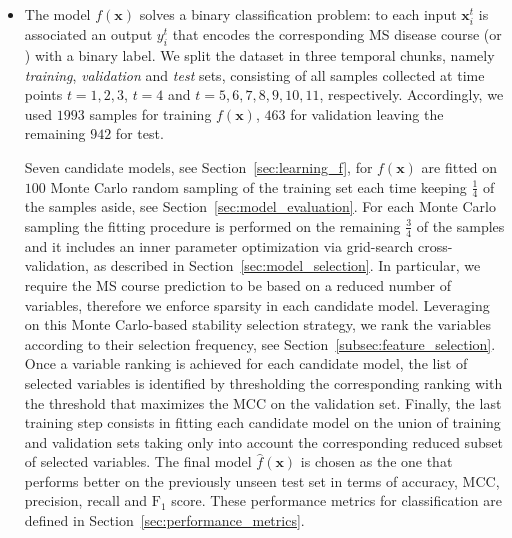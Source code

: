 \begin{itemize}
	\item[] \textbf{\F} The \F model $f(\bm{x})$ solves a binary classification problem: to each input $\bm{x}_i^t$ is associated  an output $y_i^t$ that encodes the corresponding MS disease course (\RR or \SP) with a binary label.
	We split the dataset in three temporal chunks, namely \textit{training}, \textit{validation} and \textit{test} sets, consisting of all samples collected at time points $t=1,2,3$, $t=4$ and $t=5,6,7,8,9,10,11$, respectively.
	Accordingly, we used $1993$ samples for training $f(\bm{x})$, $463$ for validation leaving the remaining $942$ for test.
	
	Seven candidate models, see Section~\ref{sec:learning_f}, for $f(\bm{x})$ are fitted on $100$ Monte Carlo random sampling of the training set each time keeping $\frac{1}{4}$ of the samples aside, see Section~\ref{sec:model_evaluation}. For each Monte Carlo sampling the fitting procedure is performed on the remaining $\frac{3}{4}$ of the samples and it includes an inner parameter optimization via grid-search cross-validation, as described in Section~\ref{sec:model_selection}. In particular, we require the MS course prediction to be based on a reduced number of variables, therefore we enforce sparsity in each candidate model.
	Leveraging on this Monte Carlo-based stability selection strategy, we rank the variables according to their selection frequency, see Section~\ref{subsec:feature_selection}.
	Once a variable ranking is achieved for each candidate model, the list of selected variables is identified by thresholding the corresponding ranking with the threshold that maximizes the MCC on the validation set. Finally, the last training step consists in fitting each candidate model on the union of training and validation sets taking only into account the corresponding reduced subset of selected variables. The final \F model $\hat{f}(\bm{x})$ is chosen as the one that performs better on the previously unseen test set in terms of accuracy, MCC, precision, recall and $\text{F}_1$ score.
	These performance metrics for classification are defined in Section~\ref{sec:performance_metrics}.


\end{itemize}
